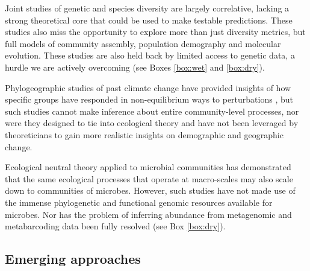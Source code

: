 \documentclass[12pt]{article}
\newcounter{Box}
\begin{document}
Joint studies of genetic and species diversity
\cite{Vanoverbeke2015-ym, Vellend2005-up, Vellend2014-ir,
  Papadopoulou2011-bd} are largely correlative, lacking a strong
theoretical core that could be used to make testable
predictions. These studies also miss the opportunity to explore more
than just diversity metrics, but full models of community assembly,
population demography and molecular evolution.  These studies are also
held back by limited access to genetic data, a hurdle we are actively
overcoming (see Boxes \ref{box:wet} and \ref{box:dry}).

Phylogeographic studies of past climate change have provided insights
of how specific groups have responded in non-equilibrium ways to
perturbations \cite{Arbogast2001-jx, Smith2012-db, Hickerson2005-ek,
  Satler2016-lb}, but such studies cannot make inference about entire
community-level processes, nor were they designed to tie into
ecological theory and have not been leveraged by theoreticians to gain
more realistic insights on demographic and geographic change.

Ecological neutral theory applied to microbial communities
\cite{Venkataraman2015-rk} has demonstrated that the same ecological
processes that operate at macro-scales may also scale down to
communities of microbes. However, such studies have not made use of
the immense phylogenetic and functional genomic resources available
for microbes. Nor has the problem of inferring abundance from
metagenomic and metabarcoding data been fully resolved (see Box
\ref{box:dry}).

\subsection{Emerging approaches}
\end{document}
